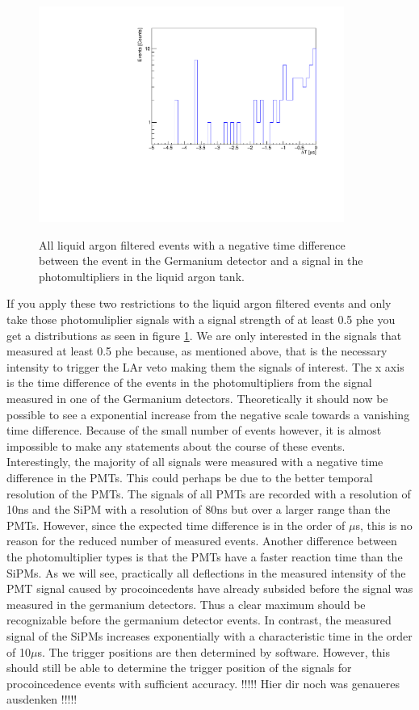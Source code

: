 \begin{figure}[t!]
	\centering
	\ifmakefigures%
	\includegraphics[width=100mm]{./Bilder/TriggerTimeOnly4.pdf}
	\fi%
	\label{fig:Trigger4}
	\caption{
		All liquid argon filtered events with a negative time difference between the event in the Germanium detector and a signal in the photomultipliers in the liquid argon tank.
	}
\end{figure}

If you apply these two restrictions to the liquid argon filtered events and only take those photomuliplier signals with a signal strength of at least 0.5 phe you get a distributions as seen in figure \ref{fig:Trigger4}.
We are only interested in the signals that measured at least 0.5 phe because, as mentioned above, that is the necessary intensity to trigger the LAr veto making them the signals of interest. 
The x axis is the time difference of the events in the photomultipliers from the signal measured in one of the Germanium detectors.
Theoretically it should now be possible to see a exponential increase from the negative scale towards a vanishing time difference.
Because of the small number of events however, it is almost impossible to make any statements about the course of these events.
\\

Interestingly, the majority of all signals were measured with a negative time difference in the PMTs. 
This could perhaps be due to the better temporal resolution of the PMTs. 
The signals of all PMTs are recorded with a resolution of 10ns and the SiPM with a resolution of 80ns but over a larger range than the PMTs\cite{nature}. 
However, since the expected time difference is in the order of \(\mu\)s, this is no reason for the reduced number of measured events. 
Another difference between the photomultiplier types is that the PMTs have a faster reaction time than the SiPMs. 
As we will see, practically all deflections in the measured intensity of the PMT signal caused by procoincedents have already subsided before the signal was measured in the germanium detectors. 
Thus a clear maximum should be recognizable before the germanium detector events.
In contrast, the measured signal of the SiPMs increases exponentially with a characteristic time in the order of 10\(\mu\)s. 
The trigger positions are then determined by software. 
However, this should still be able to determine the trigger position of the signals for procoincedence events with sufficient accuracy.
!!!!! Hier dir noch was genaueres ausdenken !!!!!
\\

